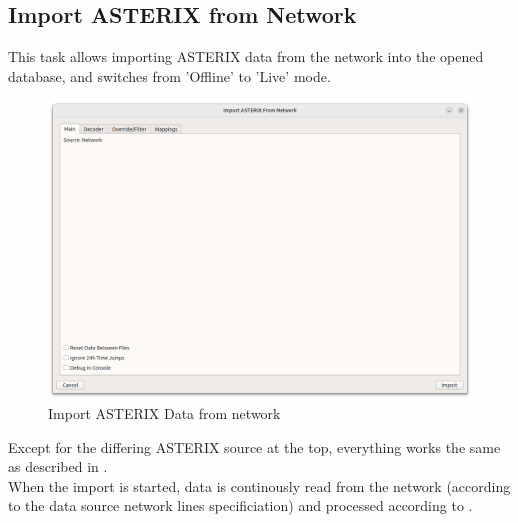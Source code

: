 \subsection{Import ASTERIX from Network}
\label{sec:ui_import_asterix_network}

This task allows importing ASTERIX data from the network into the opened database, and switches from 'Offline' to 'Live' mode. \\

\begin{figure}[H]
  \center
    \hspace*{-0.5cm}
    \includegraphics[width=17cm]{figures/asterix_import_data_network.png}
  \caption{Import ASTERIX Data from network}
\end{figure}

Except for the differing ASTERIX source at the top, everything works the same as described in . \\

When the import is started, data is continously read from the network (according to the data source network lines specificiation) and processed according to .
